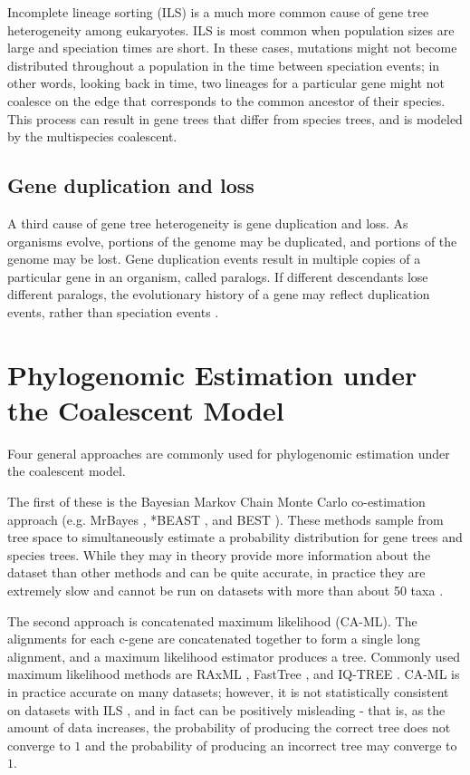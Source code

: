 \documentclass[tocnosub,noragright,centerchapter,fullpagesingle,12pt]{uiuc_csthesis18}
\begin{document}
Incomplete lineage sorting (ILS) \cite{maddison1997gene} is a much more common cause of gene
tree heterogeneity among eukaryotes. ILS is most common when population sizes are large and speciation times are short. In these cases, mutations might not become distributed throughout a population in the time between speciation events; in other words, looking back in time, two lineages for a particular gene might not coalesce on the edge that corresponds to the common ancestor of their species. This process can result in gene trees that differ from species trees, and is modeled by the multispecies coalescent. 

\subsection{Gene duplication and loss}

A third cause of gene tree heterogeneity is gene duplication and loss. As organisms evolve, portions of the genome may be duplicated, and portions of the genome may be lost. Gene duplication events result in multiple copies of a particular gene in an organism, called paralogs. If different descendants lose different paralogs, the evolutionary history of a gene may reflect duplication events, rather than speciation events \cite{maddison1997gene}.

\section{Phylogenomic Estimation under the Coalescent Model}

Four general approaches are commonly used for phylogenomic estimation under the coalescent model. 

The first of these is the Bayesian Markov Chain Monte Carlo co-estimation approach (e.g. MrBayes \cite{ronquist2012mrbayes}, *BEAST \cite{Heled2010}, and BEST \cite{Liu2008}). These methods sample from tree space to simultaneously estimate a probability distribution for gene trees and species trees. While they may in theory provide more information about the dataset than other methods and can be quite accurate, in practice they are extremely slow and cannot be run on datasets with more than about 50 taxa \cite{bbca}.

The second approach is concatenated maximum likelihood (CA-ML). The alignments for each c-gene are concatenated together to form a single long alignment, and a maximum likelihood estimator produces a tree. Commonly used maximum likelihood methods are RAxML \cite{stamatakis2014raxml,Stamatakis2006}, FastTree \cite{price2010fasttree}, and IQ-TREE \cite{nguyen2014iq}. CA-ML is in practice accurate on many datasets; however, it is not statistically consistent on datasets with ILS \cite{RochSteel-journal}, and in fact can be positively misleading - that is, as the amount of data increases, the probability of producing the correct tree does not converge to $1$ and the probability of producing an incorrect tree may converge to $1$.
\end{document}
